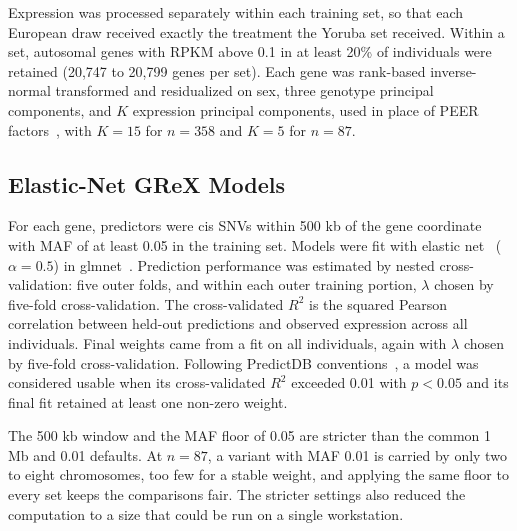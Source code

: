 \documentclass[conference]{IEEEtran}
\begin{document}
Expression was processed separately within each training set, so that each European draw received exactly the treatment the Yoruba set received. Within a set, autosomal genes with RPKM above 0.1 in at least 20\% of individuals were retained (20,747 to 20,799 genes per set). Each gene was rank-based inverse-normal transformed and residualized on sex, three genotype principal components, and $K$ expression principal components, used in place of PEER factors~\cite{stegle2012}, with $K = 15$ for $n = 358$ and $K = 5$ for $n = 87$.

\subsection{Elastic-Net GReX Models}
For each gene, predictors were cis SNVs within 500 kb of the gene coordinate with MAF of at least 0.05 in the training set. Models were fit with elastic net~\cite{zou2005} ($\alpha = 0.5$) in glmnet~\cite{friedman2010}. Prediction performance was estimated by nested cross-validation: five outer folds, and within each outer training portion, $\lambda$ chosen by five-fold cross-validation. The cross-validated $R^2$ is the squared Pearson correlation between held-out predictions and observed expression across all individuals. Final weights came from a fit on all individuals, again with $\lambda$ chosen by five-fold cross-validation. Following PredictDB conventions~\cite{gamazon2015,barbeira2018}, a model was considered usable when its cross-validated $R^2$ exceeded 0.01 with $p < 0.05$ and its final fit retained at least one non-zero weight.

The 500 kb window and the MAF floor of 0.05 are stricter than the common 1 Mb and 0.01 defaults. At $n = 87$, a variant with MAF 0.01 is carried by only two to eight chromosomes, too few for a stable weight, and applying the same floor to every set keeps the comparisons fair. The stricter settings also reduced the computation to a size that could be run on a single workstation.
\end{document}
